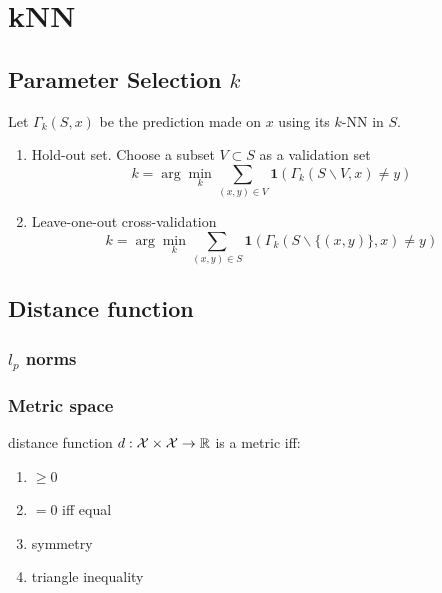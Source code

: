 \documentclass[a4paper]{report}
\begin{document}
\section{kNN}
\subsection{Parameter Selection $k$}
Let $\Gamma_k(S, x)$ be the prediction made on $x$ using its $k$-NN in $S.$
\begin{enumerate}
\item Hold-out set. Choose a subset $V\subset S$ as a validation set 
$$
k = \arg\min_k \sum_{(x, y)\in V} \textbf{1}(\Gamma_k(S\backslash V, x)\neq y)
$$
\item Leave-one-out cross-validation 
$$
k = \arg\min_k \sum_{(x, y)\in S} \textbf{1}(\Gamma_k(S\backslash\{(x, y)\}, x)\neq y)
$$
\end{enumerate}
\subsection{Distance function}
\subsubsection{$l_p$ norms}

\subsubsection{Metric space} 
distance function $d: \mathcal{X}\times\mathcal{X}\rightarrow \mathbb{R}$ is a metric iff:
\begin{enumerate}
\item $\geq0$
\item $=0$ iff equal
\item symmetry
\item triangle inequality
\end{enumerate}
\end{document}
